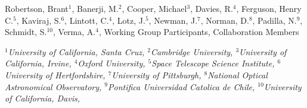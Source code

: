 Robertson, Brant$^{1}$, Banerji, M.$^{2}$, Cooper, Michael$^{3}$, Davies, R.$^{4}$, Ferguson, Henry C.$^{5}$, Kaviraj, S.$^{6}$, Lintott, C.$^{4}$, Lotz, J.$^{5}$, Newman, J.$^{7}$, Norman, D.$^{8}$, Padilla, N.$^{9}$, Schmidt, S.$^{10}$, Verma, A.$^{4}$, Working Group Participants, Collaboration Members

\vspace*{5mm}

{\centering\it\small
$^{1}$University of California, Santa Cruz,
$^{2}$Cambridge University,
$^{3}$University of California, Irvine,
$^{4}$Oxford University,
$^{5}$Space Telescope Science Institute,
$^{6}$University of Hertfordshire,
$^{7}$University of Pittsburgh,
$^{8}$National Optical Astronomical Observatory,
$^{9}$Pontifica Universidad Catolica de Chile,
$^{10}$University of California, Davis,
}
